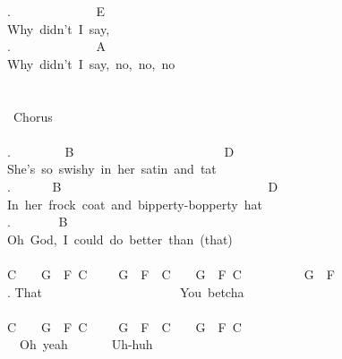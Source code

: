 {. \ \ \ \ \ \ \ \ \ \ \ \ \ E\\
Why\ didn't\ I\ say,\\
. \ \ \ \ \ \ \ \ \ \ \ \ \ A\\
Why\ didn't\ I\ say,\ no,\ no,\ no\\
\\
\\
\lbrack\ Chorus\rbrack\\
\\
. \ \ \ \ \ \ \ \ B\ \ \ \ \ \ \ \ \ \ \ \ \ \ \ \ \ \ \ \ \ \ \ \ D\\
She's\ so\ swishy\ in\ her\ satin\ and\ tat\\
. \ \ \ \ \ \ B\ \ \ \ \ \ \ \ \ \ \ \ \ \ \ \ \ \ \ \ \ \ \ \ \ \ \ \ \ \ \ \ \ D\\
In\ her\ frock\ coat\ and\ bipperty-bopperty\ hat\\
. \ \ \ \ \ \ \ B\\
Oh\ God,\ I\ could\ do\ better\ than\ (that)\\
\\
C\ \ \ \ G\ \ F\ C\ \ \ \ \ G\ \ F\ \ C\ \ \ \ G\ \ F\ C\ \ \ \ \ \ \ \ \ \ G\ \ F\\
. That\ \ \ \ \ \ \ \ \ \ \ \ \ \ \ \ \ \ \ \ \ \ You\ betcha\\
\\
C\ \ \ \ G\ \ F\ C\ \ \ \ \ G\ \ F\ \ C\ \ \ \ G\ \ F\ C\\
\ \ Oh\ yeah\ \ \ \ \ \ \ Uh-huh\ }
